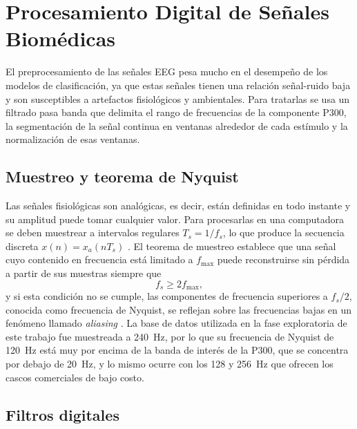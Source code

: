 \section[PROCESAMIENTO DIGITAL DE SEÑALES BIOMÉDICAS]{Procesamiento Digital de Señales
Biomédicas}
\label{sec:pds}

El preprocesamiento de las señales EEG pesa mucho en el desempeño de los modelos de
clasificación, ya que estas señales tienen una relación señal-ruido baja y son susceptibles a
artefactos fisiológicos y ambientales. Para tratarlas se usa un filtrado pasa banda que delimita el
rango de frecuencias de la componente P300, la segmentación de la señal continua en ventanas
alrededor de cada estímulo y la normalización de esas ventanas.

\subsection{Muestreo y teorema de Nyquist}

Las señales fisiológicas son analógicas, es decir, están definidas en todo instante y su amplitud
puede tomar cualquier valor. Para procesarlas en una computadora se deben muestrear a intervalos
regulares $T_s = 1/f_s$, lo que produce la secuencia discreta $x(n) = x_a(nT_s)$
\cite{proakis2007}. El teorema
de muestreo establece que una señal cuyo contenido en frecuencia está limitado a $f_{\max}$ puede
reconstruirse sin pérdida a partir de sus muestras siempre que
\begin{equation}
f_s \geq 2 f_{\max},
\label{eq:nyquist}
\end{equation}
y si esta condición no se cumple, las componentes de frecuencia superiores a $f_s/2$, conocida
como frecuencia de Nyquist, se reflejan sobre las frecuencias bajas en un fenómeno llamado
\textit{aliasing} \cite{oppenheim2010}. La base de datos utilizada en la fase exploratoria de este trabajo fue muestreada a
240~Hz, por lo que su frecuencia de Nyquist de 120~Hz está muy por encima de la banda de interés
de la P300, que se concentra por debajo de 20~Hz, y lo mismo ocurre con los 128 y 256~Hz que ofrecen los
cascos comerciales de bajo costo.

\subsection{Filtros digitales}

